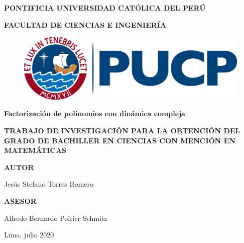 \documentclass[oneside,11pt]{book}
\theoremstyle{definition}
\theoremstyle{plain}
\theoremstyle{remark}
\begin{document}
\thispagestyle{empty}
\begin{center}


\Large \textsf{\textbf{PONTIFICIA UNIVERSIDAD CATÓLICA DEL PERÚ}}

\vspace*{0.5cm}

\large \textsf{\textbf{FACULTAD DE CIENCIAS E INGENIERÍA}}

\vspace*{2cm}

\begin{figure}[htb]
\begin{center}
\includegraphics[width=12cm]{logo.png}\\
\end{center}
\end{figure}

\vspace*{1cm}

\Large \textsf{\textbf{Factorizaci\'on de polinomios con din\'amica compleja}}

\vspace*{0.5cm}

\textsf{\textbf{TRABAJO DE INVESTIGACIÓN PARA LA OBTENCIÓN DEL GRADO DE BACHILLER 
EN CIENCIAS CON MENCIÓN EN 
MATEMÁTICAS}}

\vspace*{1.5cm}

\textsf{\textbf{AUTOR}} 

\vspace*{0.3cm}

\textsf{Jes\'us Stefano Torres Romero}

\vspace*{1.5cm}

\textsf{\textbf{ASESOR}}

\vspace*{0.3cm}

\textsf{Alfredo Bernardo Poirier Schmitz}

\vspace*{2cm}

\textsf{Lima, julio 2020}

\end{center}
\newpage
\end{document}
